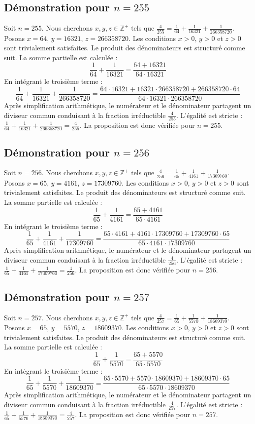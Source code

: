 \documentclass[11pt,a4paper]{article}
\begin{document}
\subsection{Démonstration pour $n = 255$}
Soit $n = 255$. Nous cherchons $x, y, z \in \mathbb{Z}^{+}$ tels que $\frac{4}{255} = \frac{1}{64} + \frac{1}{16321} + \frac{1}{266358720}$.
Posons $x = 64$, $y = 16321$, $z = 266358720$.
Les conditions $x > 0$, $y > 0$ et $z > 0$ sont trivialement satisfaites.
Le produit des dénominateurs est structuré comme suit. La somme partielle est calculée :
$$ \frac{1}{64} + \frac{1}{16321} = \frac{64+16321}{64 \cdot 16321} $$
En intégrant le troisième terme :
$$ \frac{1}{64} + \frac{1}{16321} + \frac{1}{266358720} = \frac{64 \cdot 16321 + 16321 \cdot 266358720 + 266358720 \cdot 64}{64 \cdot 16321 \cdot 266358720} $$
Après simplification arithmétique, le numérateur et le dénominateur partagent un diviseur commun conduisant à la fraction irréductible $\frac{4}{255}$.
L'égalité est stricte : $\frac{1}{64} + \frac{1}{16321} + \frac{1}{266358720} = \frac{4}{255}$.
La proposition est donc vérifiée pour $n = 255$.
\subsection{Démonstration pour $n = 256$}
Soit $n = 256$. Nous cherchons $x, y, z \in \mathbb{Z}^{+}$ tels que $\frac{4}{256} = \frac{1}{65} + \frac{1}{4161} + \frac{1}{17309760}$.
Posons $x = 65$, $y = 4161$, $z = 17309760$.
Les conditions $x > 0$, $y > 0$ et $z > 0$ sont trivialement satisfaites.
Le produit des dénominateurs est structuré comme suit. La somme partielle est calculée :
$$ \frac{1}{65} + \frac{1}{4161} = \frac{65+4161}{65 \cdot 4161} $$
En intégrant le troisième terme :
$$ \frac{1}{65} + \frac{1}{4161} + \frac{1}{17309760} = \frac{65 \cdot 4161 + 4161 \cdot 17309760 + 17309760 \cdot 65}{65 \cdot 4161 \cdot 17309760} $$
Après simplification arithmétique, le numérateur et le dénominateur partagent un diviseur commun conduisant à la fraction irréductible $\frac{4}{256}$.
L'égalité est stricte : $\frac{1}{65} + \frac{1}{4161} + \frac{1}{17309760} = \frac{4}{256}$.
La proposition est donc vérifiée pour $n = 256$.
\subsection{Démonstration pour $n = 257$}
Soit $n = 257$. Nous cherchons $x, y, z \in \mathbb{Z}^{+}$ tels que $\frac{4}{257} = \frac{1}{65} + \frac{1}{5570} + \frac{1}{18609370}$.
Posons $x = 65$, $y = 5570$, $z = 18609370$.
Les conditions $x > 0$, $y > 0$ et $z > 0$ sont trivialement satisfaites.
Le produit des dénominateurs est structuré comme suit. La somme partielle est calculée :
$$ \frac{1}{65} + \frac{1}{5570} = \frac{65+5570}{65 \cdot 5570} $$
En intégrant le troisième terme :
$$ \frac{1}{65} + \frac{1}{5570} + \frac{1}{18609370} = \frac{65 \cdot 5570 + 5570 \cdot 18609370 + 18609370 \cdot 65}{65 \cdot 5570 \cdot 18609370} $$
Après simplification arithmétique, le numérateur et le dénominateur partagent un diviseur commun conduisant à la fraction irréductible $\frac{4}{257}$.
L'égalité est stricte : $\frac{1}{65} + \frac{1}{5570} + \frac{1}{18609370} = \frac{4}{257}$.
La proposition est donc vérifiée pour $n = 257$.
\end{document}
